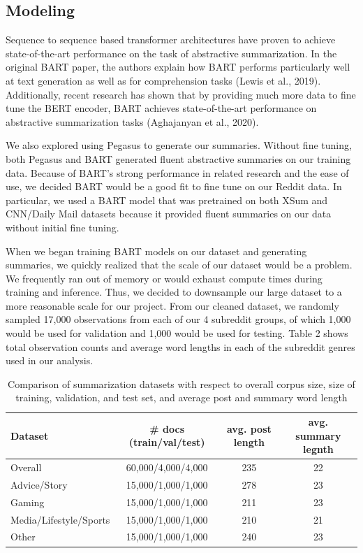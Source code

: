 \documentclass[11pt,a4paper, twocolumn]{article}
\begin{document}
\subsection{Modeling}

Sequence to sequence based transformer architectures have proven to achieve state-of-the-art performance on the task of abstractive summarization.
In the original BART paper, the authors explain how BART performs particularly well at text generation as well as for comprehension tasks (Lewis et al., 2019). 
Additionally, recent research has shown that by providing much more data to fine tune the BERT encoder, 
BART achieves state-of-the-art performance on abstractive summarization tasks (Aghajanyan et al., 2020). 

We also explored using Pegasus to generate our summaries. 
Without fine tuning, both Pegasus and BART generated fluent abstractive summaries on our training data. 
Because of BART's strong performance in related research and the ease of use, we decided BART would be a good fit to fine tune on our Reddit data. 
In particular, we used a BART model that was pretrained on both XSum and CNN/Daily Mail datasets because it provided fluent summaries on our data without initial fine tuning. 

When we began training BART models on our dataset and generating summaries, we quickly realized that the scale of our dataset would be a problem. 
We frequently ran out of memory or would exhaust compute times during training and inference. 
Thus, we decided to downsample our large dataset to a more reasonable scale for our project. 
From our cleaned dataset, we randomly sampled 17,000 observations from each of our 4 subreddit groups,
of which 1,000 would be used for validation and 1,000 would be used for testing. 
Table 2 shows total observation counts and average word lengths in each of the subreddit genres used in our analysis. 

\begin{table}
  \centering
  \begin{tabular}{lccc}
  \hline \textbf{Dataset} & \textbf{\# docs (train/val/test)} & \textbf{avg. post length} & \textbf{avg. summary legnth} \\ \hline
  Overall & 60,000/4,000/4,000  & 235 & 22 \\
  Advice/Story & 15,000/1,000/1,000 & 278 & 23 \\
  Gaming & 15,000/1,000/1,000 & 211 & 23 \\
  Media/Lifestyle/Sports & 15,000/1,000/1,000 & 210 & 21 \\
  Other & 15,000/1,000/1,000 & 240 & 23 \\
  \hline
  \end{tabular}
  \caption{\label{final_counts} Comparison of summarization datasets with respect to overall corpus size, size of training, validation, and
  test set, and average post and summary word length}
\end{table}
\end{document}

